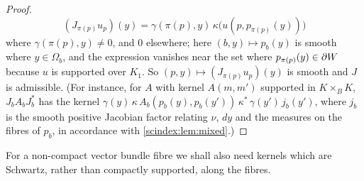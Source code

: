 \begin{proof}
\begin{equation*}
    (J_{\pi(p)}u_p)(y)=\gamma(\pi(p),y)\,\kappa\bigl(u(p,p_{\pi(p)}(y))\bigr)
  \end{equation*}
  where $\gamma(\pi(p),y)\ne0$, and $0$ elsewhere; here $(b,y)\mapsto p_b(y)$
  is smooth where $y\in\Omega_b$, and the expression vanishes near the set where
  $p_{\pi(p)}(y)\in\partial W$ because $u$ is supported over $K_1$. So
  $(p,y)\mapsto(J_{\pi(p)}u_p)(y)$ is smooth and $J$ is admissible. (For
  instance, for $A$ with kernel $A(m,m')$ supported in $K\times_BK$, $J_bA_bJ_b^*$
  has the kernel $\gamma(y)\,\kappa\,A_b(p_b(y),p_b(y'))\,\kappa^*\,\gamma(y')\,
  j_b(y')$, where $j_b$ is the smooth positive Jacobian factor relating $\nu$,
  $dy$ and the measures on the fibres of $p_b$, in accordance with
  \cref{scindex:lem:mixed}.)
\end{proof}

For a non-compact vector bundle fibre we shall also need kernels which are
Schwartz, rather than compactly supported, along the fibres.

